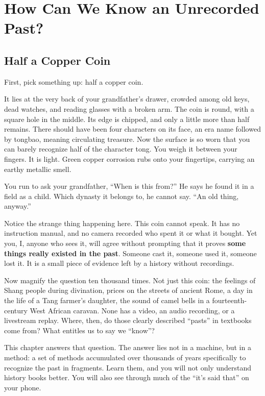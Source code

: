 \chapter{How Can We Know an Unrecorded Past?}
\section{Half a Copper Coin}
First, pick something up: half a copper coin.

It lies at the very back of your grandfather's drawer, crowded among old keys, dead watches, and reading glasses with a broken arm. The coin is round, with a square hole in the middle. Its edge is chipped, and only a little more than half remains. There should have been four characters on its face, an era name followed by tongbao, meaning circulating treasure. Now the surface is so worn that you can barely recognize half of the character tong. You weigh it between your fingers. It is light. Green copper corrosion rubs onto your fingertips, carrying an earthy metallic smell.

You run to ask your grandfather, ``When is this from?'' He says he found it in a field as a child. Which dynasty it belongs to, he cannot say. ``An old thing, anyway.''

Notice the strange thing happening here. This coin cannot speak. It has no instruction manual, and no camera recorded who spent it or what it bought. Yet you, I, anyone who sees it, will agree without prompting that it proves \textbf{some things really existed in the past}. Someone cast it, someone used it, someone lost it. It is a small piece of evidence left by a history without recordings.

Now magnify the question ten thousand times. Not just this coin: the feelings of Shang people during divination, prices on the streets of ancient Rome, a day in the life of a Tang farmer's daughter, the sound of camel bells in a fourteenth-century West African caravan. None has a video, an audio recording, or a livestream replay. Where, then, do those clearly described ``pasts'' in textbooks come from? What entitles us to say we ``know''?

This chapter answers that question. The answer lies not in a machine, but in a method: a set of methods accumulated over thousands of years specifically to recognize the past in fragments. Learn them, and you will not only understand history books better. You will also see through much of the ``it's said that'' on your phone.

